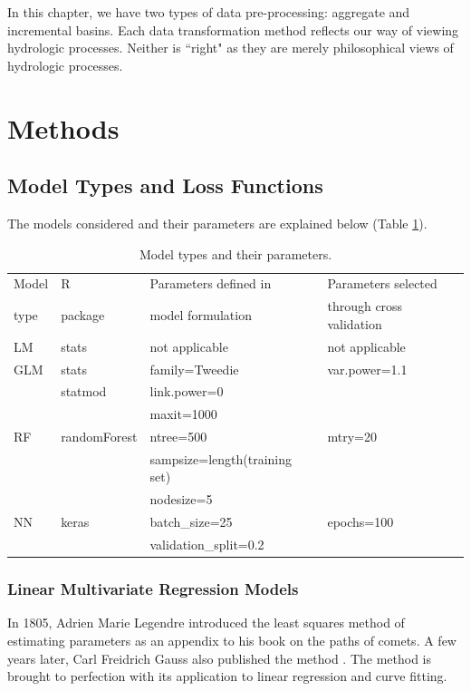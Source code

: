 In this chapter, we have two types of data pre-processing: aggregate and incremental basins. Each data transformation method reflects our way of viewing hydrologic processes. Neither is ``right" as they are merely philosophical views of hydrologic processes. 

\section{Methods}
\subsection{Model Types and Loss Functions}
The models considered and their parameters are explained below (Table \ref{table:modelspar}).

\begin{table}[h]\renewcommand{\arraystretch}{1} 
	\linespread{1.0}
	\centering
	\caption{Model types and their parameters.}
	\begin{tabular}{p{1.5cm}p{2.5cm}p{5.5cm}p{5cm}} %
		\toprule
		Model & R & Parameters defined in  & Parameters selected\\
		type & package & model formulation & through cross validation\\
		\midrule
		LM & stats & not applicable & not applicable\\
		\addlinespace
		GLM & stats & family=Tweedie & var.power=1.1 \\
		& statmod & link.power=0 & \\
		& & maxit=1000 & \\
		\addlinespace
		RF & randomForest & ntree=500 & mtry=20\\
 		&  & sampsize=length(training set) & \\
 		&  & nodesize=5 & \\
		\addlinespace
		NN & keras & batch\_size=25 & epochs=100 \\
 		&  & validation\_split=0.2 & \\
		\bottomrule
	\end{tabular}
	\label{table:modelspar}
\end{table}

\subsubsection*{Linear Multivariate Regression Models}
In 1805, Adrien Marie Legendre introduced the least squares method of estimating parameters as an appendix to his book on the paths of comets. A few years later, Carl Freidrich Gauss also published the method \cite{stigler1981gauss}. The method is brought to perfection with its application to linear regression and curve fitting. 

